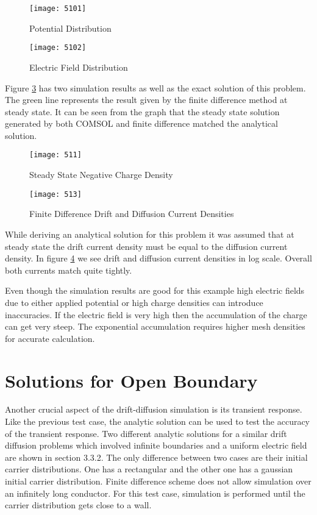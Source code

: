 \begin{doublespace}
\begin{figure}
\centering
\texttt{[image: 5101]}
\caption{Potential Distribution} 
\label{5pot}
\end{figure}

\begin{figure}
\centering
\texttt{[image: 5102]}
\caption{Electric Field Distribution} 
\label{5E}
\end{figure}

\clearpage

Figure  \ref{5ss} has two simulation results as well as the exact solution of this problem. The green line represents the result given by the finite difference method at steady state. It can be seen from the graph that the steady state solution generated by both COMSOL and finite difference matched the analytical solution.

\begin{figure}
\centering
\texttt{[image: 511]}
\caption{Steady State Negative Charge Density} 
\label{5ss}
\end{figure}

\begin{figure}[!htp]
\centering
\texttt{[image: 513]}
\caption{Finite Difference Drift and Diffusion Current Densities}
 \label{5curdens}
\end{figure}

While deriving an analytical solution for this problem it was assumed that at steady state the drift current density must be equal to the diffusion current density. In figure \ref{5curdens} we see drift and diffusion current densities in log scale. Overall both currents match quite tightly.

Even though the simulation results are good for this example high electric fields due to either applied potential or high charge densities can introduce inaccuracies. If the electric field is very high then the accumulation of the charge can get very steep. The exponential accumulation requires higher mesh densities for accurate calculation.

\clearpage
\section{Solutions for Open Boundary}
Another crucial aspect of the drift-diffusion simulation is its transient response. Like the previous test case, the analytic solution can be used to test the accuracy of the transient response. Two different analytic solutions for a similar drift diffusion problems which involved infinite boundaries and a uniform electric field are shown in section 3.3.2. The only difference between two cases are their initial carrier distributions. One has a rectangular and the other one has a gaussian initial carrier distribution. Finite difference scheme does not allow simulation over an infinitely long conductor. For this test case, simulation is performed until the carrier distribution gets close to a wall.   


\end{doublespace}
